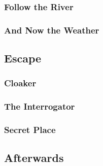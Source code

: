 \subsubsection{Follow the River}


\subsubsection{And Now the Weather}


\subsection{Escape}


\subsubsection{Cloaker}


\subsubsection{The Interrogator}


\subsubsection{Secret Place}


\subsection{Afterwards}

